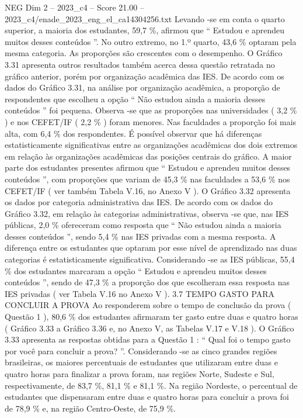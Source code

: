 \begin{textsample}{NEG Dim 2 – 2023\_c4 – Score 21.00 – 2023\_c4/enade\_2023\_eng\_el\_ca14304256.txt}
Levando -se em conta o quarto superior, a maioria dos estudantes, 59,7 \%, afirmou que “ Estudou e aprendeu muitos desses conteúdos ”.
No outro extremo, no 1.º quarto, 43,6 \% optaram pela mesma categoria.
As proporções são crescentes com o desempenho.
O Gráfico 3.31 apresenta outros resultados também acerca dessa questão retratada no gráfico anterior, porém por organização acadêmica das IES.
De acordo com os dados do Gráfico 3.31, na análise por organização acadêmica, a proporção de respondentes que escolheu a opção “ Não estudou ainda a maioria desses conteúdos ” foi pequena.
Observa -se que as proporções nas universidades ( 3,2 \% ) e nos CEFET/IF ( 2,2 \% ) foram menores.
Nas faculdades a proporção foi mais alta, com 6,4 \% dos respondentes.
É possível observar que há diferenças estatisticamente significativas entre as organizações acadêmicas dos dois extremos em relação às organizações acadêmicas das posições centrais do gráfico.
A maior parte dos estudantes presentes afirmou que “ Estudou e aprendeu muitos desses conteúdos ”, com proporções que variam de 45,3 \% nas faculdades a 53,6 \% nos CEFET/IF ( ver também Tabela V.16, no Anexo V ).
O Gráfico 3.32 apresenta os dados por categoria administrativa das IES.
De acordo com os dados do Gráfico 3.32, em relação às categorias administrativas, observa -se que, nas IES públicas, 2,0 \% ofereceram como resposta que “ Não estudou ainda a maioria desses conteúdos ”, sendo 5,4 \% nas IES privadas com a mesma resposta.
A diferença entre os estudantes que optaram por esse nível de aprendizado nas duas categorias é estatisticamente significativa.
Considerando -se as IES públicas, 55,4 \% dos estudantes marcaram a opção “ Estudou e aprendeu muitos desses conteúdos ”, sendo de 47,3 \% a proporção dos que escolheram essa resposta nas IES privadas ( ver Tabela V.16 no Anexo V ). 3.7 TEMPO GASTO PARA CONCLUIR A PROVA Ao responderem sobre o tempo de conclusão da prova ( Questão 1 ), 80,6 \% dos estudantes afirmaram ter gasto entre duas e quatro horas ( Gráfico 3.33 a Gráfico 3.36 e, no Anexo V, as Tabelas V.17 e V.18 ).
O Gráfico 3.33 apresenta as respostas obtidas para a Questão 1 : “ Qual foi o tempo gasto por você para concluir a prova? ”.
Considerando -se as cinco grandes regiões brasileiras, os maiores percentuais de estudantes que utilizaram entre duas e quatro horas para finalizar a prova foram, nas regiões Norte, Sudeste e Sul, respectivamente, de 83,7 \%, 81,1 \% e 81,1 \%.
Na região Nordeste, o percentual de estudantes que dispensaram entre duas e quatro horas para concluir a prova foi de 78,9 \% e, na região Centro-Oeste, de 75,9 \%.

\end{textsample}
